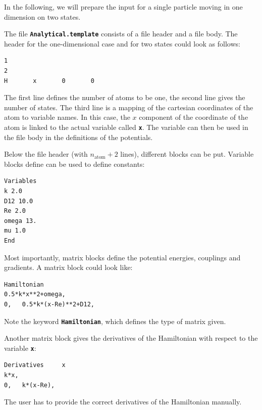 \documentclass[a4paper,11pt,DIV=15,openany]{scrbook}
\newcommand{\ttt}[1]{\textbf{\texttt{#1}}}
\begin{document}
In the following, we will prepare the input for a single particle moving in one dimension on two states.

The file \ttt{Analytical.template} consists of a file header and a file body. The header for the one-dimensional case and for two states could look as follows:
\begin{oframed}
\footnotesize\begin{Verbatim}[commandchars=\\\{\}]
1
2
H       x       0       0
\end{Verbatim}
\end{oframed}
The first line defines the number of atoms to be one, the second line gives the number of states. The third line is a mapping of the cartesian coordinates of the atom to variable names. In this case, the $x$ component of the coordinate of the atom is linked to the actual variable called \ttt{x}. The variable can then be used in the file body in the definitions of the potentials.

Below the file header (with $n_\text{atom}+2$ lines), different blocks can be put. Variable blocks define can be used to define constants:
\begin{oframed}
\footnotesize\begin{Verbatim}[commandchars=\\\{\}]
Variables
k 2.0
D12 10.0
Re 2.0
omega 13.
mu 1.0
End
\end{Verbatim}
\end{oframed}

Most importantly, matrix blocks define the potential energies, couplings and gradients. A matrix block could look like:
\begin{oframed}
\footnotesize\begin{Verbatim}[commandchars=\\\{\}]
Hamiltonian
0.5*k*x**2+omega,
0,   0.5*k*(x-Re)**2+D12,
\end{Verbatim}
\end{oframed}
Note the keyword \ttt{Hamiltonian}, which defines the type of matrix given.

Another matrix block gives the derivatives of the Hamiltonian with respect to the variable \ttt{x}:
\begin{oframed}
\footnotesize\begin{Verbatim}[commandchars=\\\{\}]
Derivatives     x
k*x,
0,   k*(x-Re),
\end{Verbatim}
\end{oframed}
The user has to provide the correct derivatives of the Hamiltonian manually.
\end{document}
